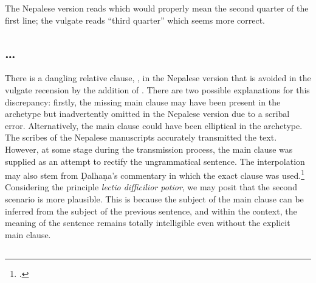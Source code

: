The Nepalese version reads  which would
properly mean the second quarter of the first line; the vulgate reads
 “third quarter” which seems more correct.

\subsection{\ldots{}}		

There is a dangling relative clause,
, in the Nepalese version that is avoided in the vulgate
recension by the addition of . 
There are two possible explanations for this discrepancy: 
firstly, the missing main clause may have been present in the archetype 
but inadvertently omitted in the Nepalese version due to a scribal error. 
Alternatively, the main clause could have been elliptical in the archetype. 
The scribes of the Nepalese manuscripts accurately transmitted the text. 
However, at some stage during the transmission process, 
the main clause was supplied as an attempt to rectify the ungrammatical sentence.
The interpolation may also stem from Ḍalhaṇa's commentary in which the exact clause was used.\footnote{
 .}
Considering the principle \emph{lectio difficilior potior}, 
we may posit that the second scenario is more plausible. 
This is because the subject of the main clause can be inferred from 
the subject of the previous sentence, and within the context, 
the meaning of the sentence remains totally intelligible even without the explicit main clause.
	
\subsection{}
	
